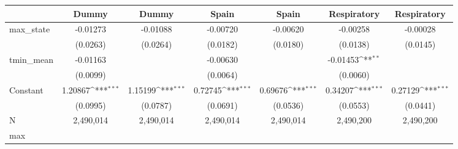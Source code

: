{
\def\sym#1{\ifmmode^{#1}\else\(^{#1}\)\fi}
\begin{tabular}{l*{6}{c}}
\toprule
            &\multicolumn{1}{c}{Dummy}&\multicolumn{1}{c}{Dummy}&\multicolumn{1}{c}{Spain}&\multicolumn{1}{c}{Spain}&\multicolumn{1}{c}{Respiratory}&\multicolumn{1}{c}{Respiratory}\\
\midrule
max\_state   &    -0.01273         &    -0.01088         &    -0.00720         &    -0.00620         &    -0.00258         &    -0.00028         \\
            &    (0.0263)         &    (0.0264)         &    (0.0182)         &    (0.0180)         &    (0.0138)         &    (0.0145)         \\
tmin\_mean   &    -0.01163         &                     &    -0.00630         &                     &    -0.01453\sym{**} &                     \\
            &    (0.0099)         &                     &    (0.0064)         &                     &    (0.0060)         &                     \\
Constant    &     1.20867\sym{***}&     1.15199\sym{***}&     0.72745\sym{***}&     0.69676\sym{***}&     0.34207\sym{***}&     0.27129\sym{***}\\
            &    (0.0995)         &    (0.0787)         &    (0.0691)         &    (0.0536)         &    (0.0553)         &    (0.0441)         \\
\midrule
N           &   2,490,014         &   2,490,014         &   2,490,014         &   2,490,014         &   2,490,200         &   2,490,200         \\
max         &                     &                     &                     &                     &                     &                     \\
\bottomrule
\end{tabular}
}
